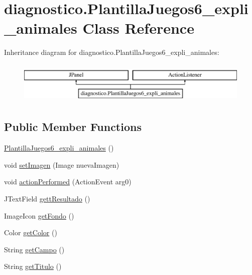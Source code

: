 \hypertarget{classdiagnostico_1_1_plantilla_juegos6__expli__animales}{}\section{diagnostico.\+Plantilla\+Juegos6\+\_\+expli\+\_\+animales Class Reference}
\label{classdiagnostico_1_1_plantilla_juegos6__expli__animales}
Inheritance diagram for diagnostico.\+Plantilla\+Juegos6\+\_\+expli\+\_\+animales\+:\begin{figure}[H]
\begin{center}
\leavevmode
\includegraphics[height=2.000000cm]{classdiagnostico_1_1_plantilla_juegos6__expli__animales}
\end{center}
\end{figure}
\subsection*{Public Member Functions}
\begin{DoxyCompactItemize}
\item 
\mbox{\hyperlink{classdiagnostico_1_1_plantilla_juegos6__expli__animales_ada03486f0d6763f9cc277c9ad64bc191}{Plantilla\+Juegos6\+\_\+expli\+\_\+animales}} ()
\item 
void \mbox{\hyperlink{classdiagnostico_1_1_plantilla_juegos6__expli__animales_a6ccb03ec47771c101fa01a10d48671ef}{set\+Imagen}} (Image nueva\+Imagen)
\item 
void \mbox{\hyperlink{classdiagnostico_1_1_plantilla_juegos6__expli__animales_a2257bd1ea7f18a61db9ba1f796f4934e}{action\+Performed}} (Action\+Event arg0)
\item 
J\+Text\+Field \mbox{\hyperlink{classdiagnostico_1_1_plantilla_juegos6__expli__animales_a5167c84310fa062d700805ce8f818de7}{gett\+Resultado}} ()
\item 
Image\+Icon \mbox{\hyperlink{classdiagnostico_1_1_plantilla_juegos6__expli__animales_a5b3c717f5ca7a5a4a968b1ea085c0972}{get\+Fondo}} ()
\item 
Color \mbox{\hyperlink{classdiagnostico_1_1_plantilla_juegos6__expli__animales_ae42b58a9d608f9928dbe84f9538968f3}{get\+Color}} ()
\item 
String \mbox{\hyperlink{classdiagnostico_1_1_plantilla_juegos6__expli__animales_a630f03978ef43351f810d48259e00844}{get\+Campo}} ()
\item 
String \mbox{\hyperlink{classdiagnostico_1_1_plantilla_juegos6__expli__animales_a7b9bf41535eb4ef140a68ae27009c07c}{get\+Titulo}} ()
\end{DoxyCompactItemize}
